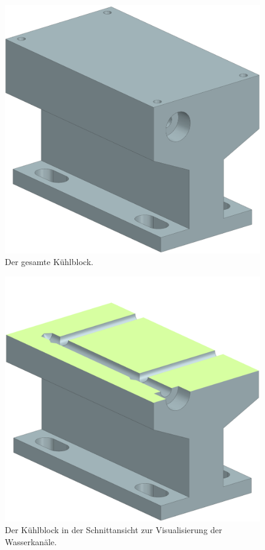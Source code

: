 \begin{appendix}
\begin{figure}[H]
    \centering
    \includegraphics[scale=0.35]{98_images/kuehlblock_isometrie.PNG}
    \caption{Der gesamte Kühlblock.}
    \label{fig:enter-label}
\end{figure}

\begin{figure}[H]
    \centering
    \includegraphics[scale=0.35]{98_images/kuehlblock_section.PNG}
    \caption{Der Kühlblock in der Schnittansicht zur Visualisierung der Wasserkanäle.}
    \label{fig:enter-label}
\end{figure}


\end{appendix}
